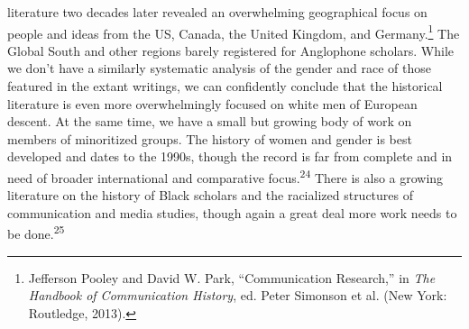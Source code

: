 \documentclass{tufte-handout}
\begin{document}
literature two decades later revealed an overwhelming geographical focus
on people and ideas from the US, Canada, the United Kingdom, and
Germany.\footnote{Jefferson Pooley and David W. Park, ``Communication
  Research,'' in \emph{The Handbook of Communication History}, ed. Peter
  Simonson et al. (New York: Routledge, 2013).} The Global South and
other regions barely registered for Anglophone scholars. While we don't
have a similarly systematic analysis of the gender and race of those
featured in the extant writings, we can confidently conclude that the
historical literature is even more overwhelmingly focused on white men
of European descent. At the same time, we have a small but growing body
of work on members of minoritized groups. The history of women and
gender is best developed and dates to the 1990s, though the record is
far from complete and in need of broader international and comparative
focus.\textsuperscript{24} There is also a growing literature on the
history of Black scholars and the racialized structures of communication
and media studies, though again a great deal more work needs to be
done.\textsuperscript{25}
\end{document}
